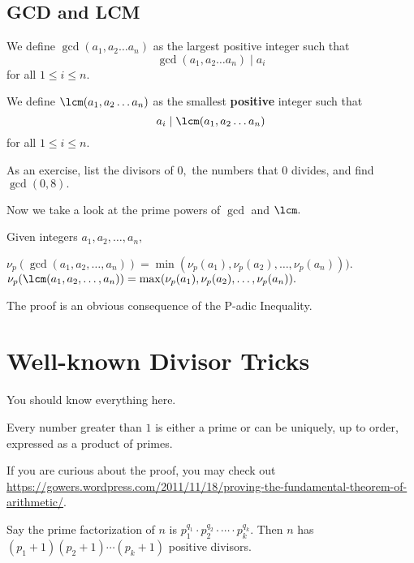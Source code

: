 \documentclass[blue,onecol]{shooting}
\begin{document}
\subsection{GCD and LCM}
\begin{defi}We define $\gcd(a_1,a_2\dots a_n)$ as the largest positive integer such that \[\gcd(a_1,a_2\dots a_n)\mid a_i\] for all $1\leq i\leq n.$\end{defi}

\begin{defi}We define $\lcm(a_1,a_2\dots a_n)$ as the smallest \textbf{positive} integer such that \[a_i\mid \lcm(a_1,a_2\dots a_n)\] for all $1\leq i\leq n.$\end{defi}
As an exercise, list the divisors of $0,$ the numbers that $0$ divides, and find $\gcd(0,8).$

Now we take a look at the prime powers of $\gcd$ and $\lcm.$
\begin{fact}
Given integers $a_1,a_2,\ldots,a_n,$
\begin{itemize}
\Item $\nu_p(\gcd(a_1,a_2,\ldots,a_n))=\min(\nu_p(a_1),\nu_p(a_2),\ldots,\nu_p(a_n))).$
\Item $\nu_p(\lcm(a_1,a_2,\ldots,a_n))=\max(\nu_p(a_1),\nu_p(a_2),\ldots,\nu_p(a_n)).$
\end{itemize}
\end{fact}

The proof is an obvious consequence of the P-adic Inequality.

\section{Well-known Divisor Tricks}
You should know everything here.

\begin{theo}
Every number greater than $1$ is either a prime or can be uniquely, up to order, expressed as a product of primes.
\end{theo}

If you are curious about the proof, you may check out \url{https://gowers.wordpress.com/2011/11/18/proving-the-fundamental-theorem-of-arithmetic/}.

\begin{theo}
Say the prime factorization of $n$ is $p_1^{q_1}\cdot p_2^{q_2}\cdot\cdots\cdot p_k^{q_k}.$ Then $n$ has $(p_1+1)(p_2+1)\cdots(p_k+1)$ positive divisors.
\end{theo}
\end{document}
